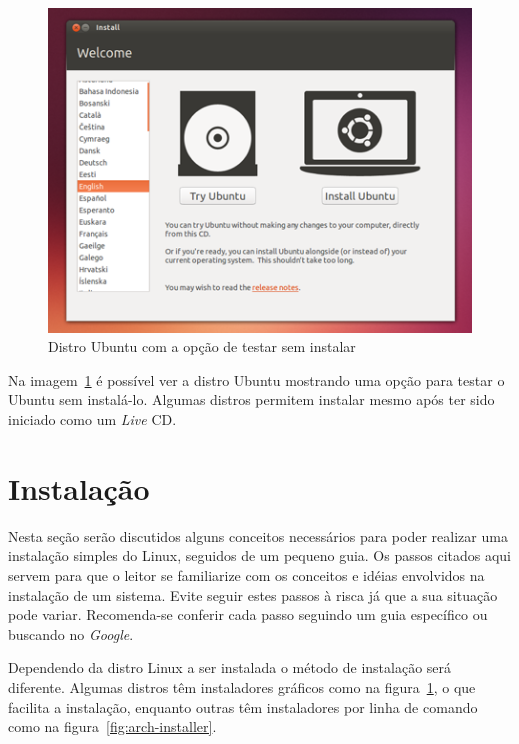 \documentclass{handout_utfpr}
\begin{document}
\begin{figure}[!h]
  \centering
  \includegraphics[scale=.5]{imagens/ubuntu-livecd.png}
  \caption{Distro Ubuntu com a opção de testar sem instalar}
  \label{fig:ubuntu-live}
\end{figure}

Na imagem~\ref{fig:ubuntu-live} é possível ver a distro Ubuntu mostrando uma opção para testar o Ubuntu sem instalá-lo. Algumas distros permitem instalar mesmo após ter sido iniciado como um \textit{Live} CD.

\section{Instalação}
Nesta seção serão discutidos alguns conceitos necessários para poder realizar uma instalação simples do Linux, seguidos de um pequeno guia. Os passos citados aqui servem para que o leitor se familiarize com os conceitos e idéias envolvidos na instalação de um sistema. Evite seguir estes passos à risca já que a sua situação pode variar. Recomenda-se conferir cada passo seguindo um guia específico ou buscando no \emph{Google}.

Dependendo da distro Linux a ser instalada o método de instalação será diferente. Algumas distros têm instaladores gráficos como na figura~\ref{fig:ubuntu-live}, o que facilita a instalação, enquanto outras têm instaladores por linha de comando como na figura~\ref{fig:arch-installer}.
\end{document}
